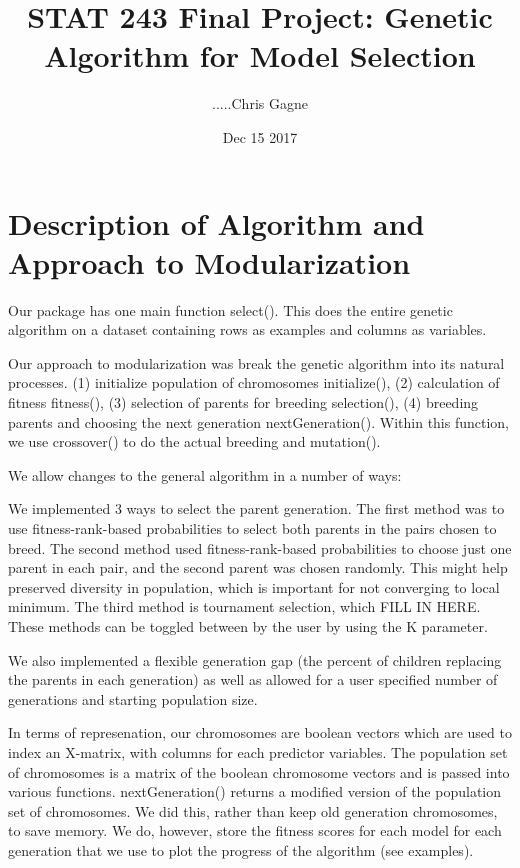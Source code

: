 \documentclass{article}\usepackage[]{graphicx}\usepackage[]{color}
\begin{document}
\title{STAT 243 Final Project: Genetic Algorithm for Model Selection}
\author{.....Chris Gagne}
\date{Dec 15 2017}

\maketitle



\section*{Description of Algorithm and Approach to Modularization}

Our package has one main function select(). This does the entire genetic algorithm on a dataset containing rows as examples and columns as variables.

Our approach to modularization was break the genetic algorithm into its natural processes.
(1) initialize population of chromosomes initialize(),
(2) calculation of fitness fitness(),
(3) selection of parents for breeding selection(),
(4) breeding parents and choosing the next generation nextGeneration(). Within this function, we use crossover() to do the actual breeding and mutation().

We allow changes to the general algorithm in a number of ways:

We implemented 3 ways to select the parent generation. The first method was to use fitness-rank-based probabilities to select both parents in the pairs chosen to breed. The second method used fitness-rank-based probabilities to choose just one parent in each pair, and the second parent was chosen randomly. This might help preserved diversity in population, which is important for not converging to local minimum. The third method is tournament selection, which FILL IN HERE. These methods can be toggled between by the user by using the K parameter.

We also implemented a flexible generation gap (the percent of children replacing the parents in each generation) as well as allowed for a user specified number of generations and starting population size.

In terms of represenation, our chromosomes are boolean vectors which are used to index an X-matrix, with columns for each predictor variables. The population set of chromosomes is a matrix of the boolean chromosome vectors and is passed into various functions. nextGeneration() returns a modified version of the population set of chromosomes. We did this, rather than keep old generation chromosomes, to save memory. We do, however, store the fitness scores for each model for each generation that we use to plot the progress of the algorithm (see examples).
\end{document}
